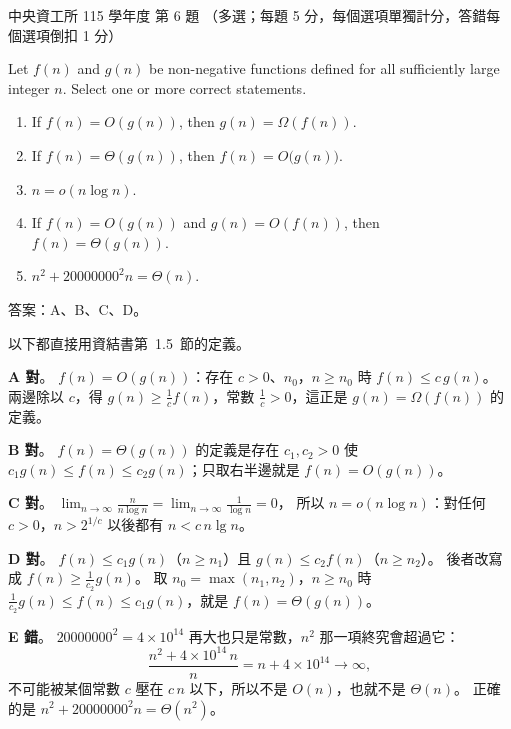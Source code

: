\begin{pastexam}[label={px:ncu-115-dsa-06}]{中央資工所 115 學年度 第 6 題}
（多選；每題 5 分，每個選項單獨計分，答錯每個選項倒扣 1 分）

Let $f(n)$ and $g(n)$ be non-negative functions defined for all sufficiently large integer $n$. Select one or more correct statements.
\begin{enumerate}[label=\Alph*.]
\item If $f(n)=O(g(n))$, then $g(n)=\Omega(f(n))$.
\item If $f(n)=\Theta(g(n))$, then $f(n)=O\big(g(n)\big)$.
\item $n=o(n\log n)$.
\item If $f(n)=O(g(n))$ and $g(n)=O(f(n))$, then $f(n)=\Theta(g(n))$.
\item $n^2+20000000^2n=\Theta(n)$.
\end{enumerate}
\end{pastexam}

\begin{pastsoln}
答案：A、B、C、D。

以下都直接用資結書第~1.5~節的定義。

\textbf{A 對}。 $f(n) = O(g(n))$：存在 $c > 0$、$n_0$，$n \ge n_0$ 時 $f(n) \le c\,g(n)$。 兩邊除以
$c$，得 $g(n) \ge \frac{1}{c} f(n)$，常數 $\frac1c > 0$，這正是 $g(n) = \Omega(f(n))$ 的定義。

\textbf{B 對}。 $f(n) = \Theta(g(n))$ 的定義是存在 $c_1, c_2 > 0$ 使
$c_1 g(n) \le f(n) \le c_2 g(n)$；只取右半邊就是 $f(n) = O(g(n))$。

\textbf{C 對}。 $\displaystyle\lim_{n \to \infty} \frac{n}{n \log n} = \lim_{n \to \infty} \frac{1}{\log n} = 0$，
所以 $n = o(n \log n)$：對任何 $c > 0$，$n > 2^{1/c}$ 以後都有 $n < c\, n \lg n$。

\textbf{D 對}。 $f(n) \le c_1 g(n)$（$n \ge n_1$）且 $g(n) \le c_2 f(n)$（$n \ge n_2$）。 後者改寫成
$f(n) \ge \frac{1}{c_2} g(n)$。 取 $n_0 = \max(n_1, n_2)$，$n \ge n_0$ 時
$\frac{1}{c_2} g(n) \le f(n) \le c_1 g(n)$，就是 $f(n) = \Theta(g(n))$。

\textbf{E 錯}。 $20000000^2 = 4 \times 10^{14}$ 再大也只是常數，$n^2$ 那一項終究會超過它：
\[
\frac{n^2 + 4 \times 10^{14}\, n}{n} = n + 4 \times 10^{14} \to \infty,
\]
不可能被某個常數 $c$ 壓在 $c\,n$ 以下，所以不是 $O(n)$，也就不是 $\Theta(n)$。 正確的是
$n^2 + 20000000^2 n = \Theta(n^2)$。
\end{pastsoln}

